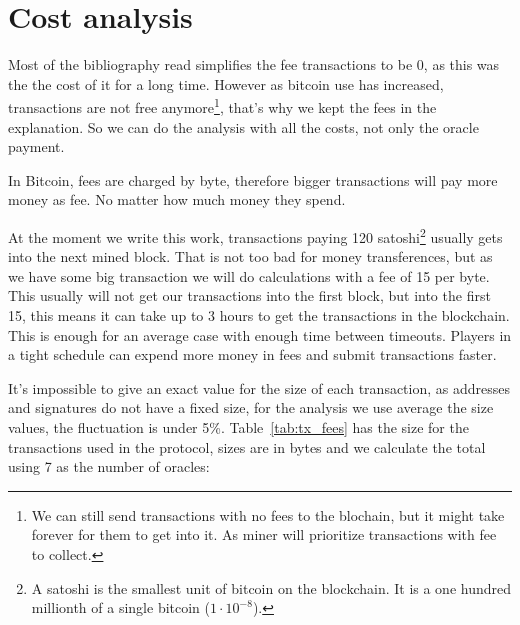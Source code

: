 \section {Cost analysis} \label{sec:cost_analysis}
\newcommand\numoracles[0]{7}%
\newcommand\feeval[0]{15}%
\newcommand\bitcoinusd[0]{3800}%
\newcommand\txcost[2]{\calculatecosts{#1}{#2}{\numoracles{}}{\feeval{}}}%
\newcommand\usdcost[1]{\satoshitousd{#1}{\bitcoinusd{}}}%

Most of the bibliography read simplifies the fee transactions to be 0,
  as this was the the cost of it for a long time.
However as bitcoin use has increased, transactions are not free
  anymore\footnote{We can still send transactions with no fees to the blochain,
    but it might take forever for them to get into it. As miner will prioritize
    transactions with fee to collect.}, that's why we kept the fees in the
  explanation.
So we can do the analysis with all the costs, not only the oracle payment.

In Bitcoin, fees are charged by byte, therefore bigger transactions will pay more
  money as fee.
No matter how much money they spend.

At the moment we write this work, transactions paying 120 satoshi\footnote{A
  satoshi is the smallest unit of bitcoin on the blockchain. It is a one hundred
  millionth of a single bitcoin ($1 \cdot 10^{-8}$).} usually gets into the next
  mined block.
That is not too bad for money transferences, but as we have some big transaction
  we will do calculations with a fee of \feeval{} per byte.
This usually will not get our transactions into the first block, but into the
  first 15, this means it can take up to 3 hours to get the transactions in
  the blockchain.
This is enough for an average case with enough time between timeouts.
Players in a tight schedule can expend more money in fees and submit
  transactions faster.

It's impossible to give an exact value for the size of each transaction, as
  addresses and signatures do not have a fixed size, for the analysis we use
  average the size values, the fluctuation is under 5\%.
Table~\ref{tab:tx_fees} has the size for the transactions used in the protocol,
  sizes are in bytes and we calculate the total using \numoracles{} as the number
  of oracles:

